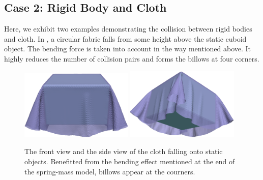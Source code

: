 \subsection{Case 2: Rigid Body and Cloth}
Here, we exhibit two examples demonstrating the collision between rigid
bodies and cloth.
In , a circular fabric falls from some height
above the static cuboid object.
The bending force is taken into account in the way mentioned above. 
It highly reduces the number of collision pairs and forms the billows at
four corners.
\begin{figure}[!ht]
\centering
\includegraphics[width=0.48\textwidth]{figures/fall_box_0}
\includegraphics[width=0.48\textwidth]{figures/fall_box_1}
\caption{The front view and the side view of the cloth falling onto static
objects. Benefitted from the bending effect mentioned at the end of the
spring-mass model, billows appear at the courners.}
\label{fig:rigid_cloth_collsn}
\end{figure}


